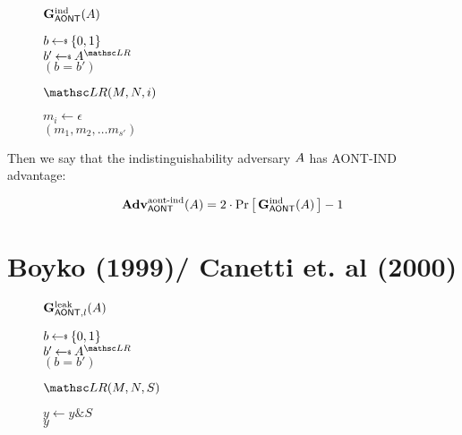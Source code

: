 \documentclass[11pt,twoside]{article}
\begin{document}
\begin{figure}[H]
{
\underline{$\mathbf{G}_{\mathsf{AONT}}^\text{ind}(A)$}

\begin{algorithm}[H]
$b \getsr \bits$\\
$b' \getsr \advA^{\LRO}$\\
\Return $(b=b')$
\end{algorithm}

\smallskip
\underline{$\LRO(M,N,i)$}

\begin{algorithm}[H]
$m_i\gets \epsilon$\\
{\Return $(m_1,m_2,\dots m_{s'})$}
\end{algorithm}
}
\end{figure}

Then we say that the indistinguishability adversary $A$ has AONT-IND advantage: 

$$\textbf{Adv}^\text{aont-ind}_\mathsf{AONT}(A)=2\cdot{\Pr\left[\,{\mathbf{G}_{\mathsf{AONT}}^\text{ind}(A)}\,\right]} - 1$$

\section{Boyko (1999)/ Canetti et. al (2000)}

\begin{figure}[H]
{
\underline{$\mathbf{G}_{\mathsf{AONT},l}^\text{leak}(A)$}

\begin{algorithm}[H]
$b \getsr \bits$\\
$b' \getsr \advA^{\LRO}$\\
\Return $(b=b')$
\end{algorithm}

\smallskip
\underline{$\LRO(M,N,S)$}

\begin{algorithm}[H]
$y\gets y\mathrel{\&} S$\\
\Return $y$
\end{algorithm}
}
\end{figure}
\end{document}
